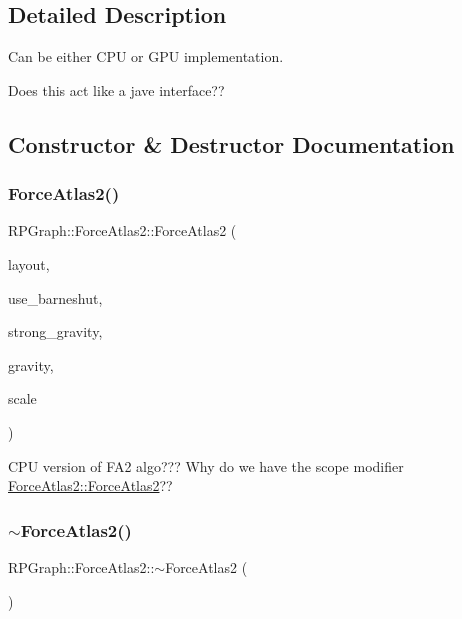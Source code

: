 \subsection{Detailed Description}
Can be either C\+PU or G\+PU implementation.

Does this act like a jave interface?? 

\subsection{Constructor \& Destructor Documentation}
\mbox{\label{classRPGraph_1_1ForceAtlas2_a4c7ce390cdedc886003571f31861eb0c}} 
\subsubsection{\texorpdfstring{Force\+Atlas2()}{ForceAtlas2()}}
{\footnotesize\ttfamily R\+P\+Graph\+::\+Force\+Atlas2\+::\+Force\+Atlas2 (\begin{DoxyParamCaption}\item[{\mbox{\hyperlink{classRPGraph_1_1GraphLayout}{Graph\+Layout}} \&}]{layout,  }\item[{bool}]{use\+\_\+barneshut,  }\item[{bool}]{strong\+\_\+gravity,  }\item[{float}]{gravity,  }\item[{float}]{scale }\end{DoxyParamCaption})}

C\+PU version of F\+A2 algo??? Why do we have the scope modifier \mbox{\hyperlink{classRPGraph_1_1ForceAtlas2_a4c7ce390cdedc886003571f31861eb0c}{Force\+Atlas2\+::\+Force\+Atlas2}}?? \mbox{\label{classRPGraph_1_1ForceAtlas2_a1be4cef4dacd90f3a6a7c3d216fd0e78}} 
\subsubsection{\texorpdfstring{$\sim$\+Force\+Atlas2()}{~ForceAtlas2()}}
{\footnotesize\ttfamily R\+P\+Graph\+::\+Force\+Atlas2\+::$\sim$\+Force\+Atlas2 (\begin{DoxyParamCaption}{ }\end{DoxyParamCaption})}



